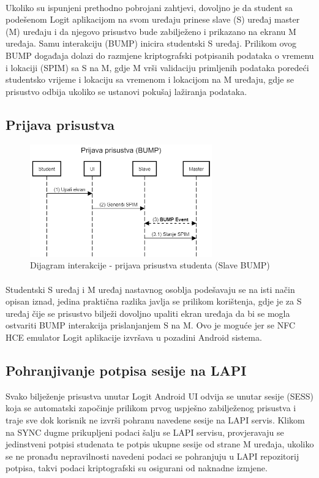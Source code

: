 \paragraph*{}
Ukoliko su ispunjeni prethodno pobrojani zahtjevi, dovoljno je da student sa podešenom Logit aplikacijom na svom uređaju prinese slave (S) uređaj master (M) uređaju i da njegovo prisustvo bude zabilježeno i prikazano na ekranu M uređaja. Samu interakciju (BUMP) inicira studentski S uređaj. Prilikom ovog BUMP događaja dolazi do razmjene kriptografski potpisanih podataka o vremenu i lokaciji (SPIM) sa S na M, gdje M vrši validaciju primljenih podataka poredeći studentsko vrijeme i lokaciju sa vremenom i lokacijom na M uređaju, gdje se prisustvo odbija ukoliko se ustanovi pokušaj lažiranja podataka.

\subsection*{Prijava prisustva}
\begin{figure}[H]
    \centering
    \includegraphics[width=0.7\textwidth]{material/dia/03_prijava}
    \caption{Dijagram interakcije - prijava prisustva studenta (Slave BUMP)}
\end{figure}

\paragraph*{}
Studentski S uređaj i M uređaj nastavnog osoblja podešavaju se na isti način opisan iznad, jedina praktična razlika javlja se prilikom korištenja, gdje je za S uređaj čije se prisustvo bilježi dovoljno upaliti ekran uređaja da bi se mogla ostvariti BUMP interakcija prislanjanjem S na M. Ovo je moguće jer se NFC HCE emulator Logit aplikacije izvršava u pozadini Android sistema.

\subsection*{Pohranjivanje potpisa sesije na LAPI}
Svako bilježenje prisustva unutar Logit Android UI odvija se unutar sesije (SESS) koja se automatski započinje prilikom prvog uspješno zabilježenog prisustva i traje sve dok korisnik ne izvrši pohranu navedene sesije na LAPI servis. Klikom na SYNC dugme prikupljeni podaci šalju se LAPI servisu, provjeravaju se jedinstveni potpisi studenata te potpis ukupne sesije od strane M uređaja, ukoliko se ne pronađu nepravilnosti navedeni podaci se pohranjuju u LAPI repozitorij potpisa, takvi podaci kriptografski su osigurani od naknadne izmjene.

